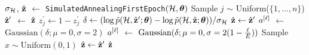 \documentclass[aps,pre,reprint,superscriptaddress,nofootinbib]{revtex4-2}
\begin{document}
    \begin{algorithm}[H]
        \begin{algorithmic}
            \caption{\texttt{SimulatedAnnealing}$(\hypergraph, \paramvector)$}\label{algocf:simulated_annealing}
            \State $\sigma_{\mathcal{H}}$, $\hat{\mathbf{z}}$ $\gets$ \texttt{SimulatedAnnealingFirstEpoch}$(\hypergraph, \paramvector)$
                    \State Sample $j$ $\sim$ Uniform($\{1,...,n\}$)
                    \State $\hat{\mathbf{z}}^\prime$ $\gets$ $\hat{\mathbf{z}}$
                    \State $z^\prime_j\gets1-z^\prime_j$
                    \State $\delta \gets (\log \tilde{p}(\mathcal{H}, \hat{\mathbf{z}}^\prime ; \boldsymbol{\theta}) - \log \tilde{p}(\mathcal{H}, \hat{\mathbf{z}} ; \boldsymbol{\theta}))/\sigma_{\mathcal{H}}$
                        \State $\hat{\mathbf{z}} \gets\hat{\mathbf{z}}^\prime$
                    \Else
                            \State $a^{[\ell]}$ $\gets$ $\mathrm{Gaussian}(\delta;\mu = 0, \sigma=2)$
                            \State $a^{[\ell]}$ $\gets$ $\mathrm{Gaussian}(\delta;\mu = 0, \sigma=2(1 - \frac{\ell}{E}))$
                        \EndIf
                        \State Sample $x \sim \text{Uniform}(0,1)$
                            \State $\hat{\mathbf{z}} \gets \hat{\mathbf{z}}^\prime$
                        \EndIf
                    \EndIf
                \EndFor
            \EndFor
            \State \Return$\hat{\mathbf{z}}$
        \end{algorithmic}
    \end{algorithm}
        
\end{document}
